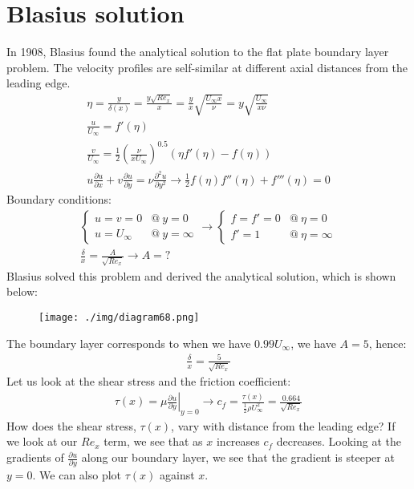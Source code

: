 \section{Blasius solution}
In 1908, Blasius found the analytical solution to the flat plate boundary layer problem. The velocity profiles are self-similar at different axial distances from the leading edge.
\begin{gather}
  \eta = \frac{y}{\delta (x)} = \frac{y\sqrt{Re_x}}{x} = \frac{y}{x} \sqrt{\frac{U_\infty x}{\nu}} = y\sqrt{\frac{U_\infty}{x\nu}}\\
  \frac{u}{U_\infty} = f'(\eta)\\
  \frac{v}{U_\infty} = \frac{1}{2} \left( \frac{\nu}{x U_\infty} \right)^{0.5} \left(\eta f'(\eta) - f (\eta)\right)\\
  u \frac{\partial u}{\partial x} + v\frac{\partial u}{\partial y} = \nu \frac{\partial^2 u}{\partial y^2} \rightarrow \frac{1}{2} f(\eta) f''(\eta)+f'''(\eta) = 0
\end{gather}
Boundary conditions:
\begin{gather}
  \begin{cases}
    u = v = 0    & @\  y = 0     \\
    u = U_\infty & @\ y = \infty
  \end{cases}\rightarrow \begin{cases}
    f = f' = 0 & @ \ \eta = 0      \\
    f' = 1     & @ \ \eta = \infty
  \end{cases}\\
  \frac{\delta}{x} = \frac{A}{\sqrt{Re_x}} \rightarrow A = ?
\end{gather}
Blasius solved this problem and derived the analytical solution, which is shown below:
\begin{figure}[H]
  \centering
  \texttt{[image: ./img/diagram68.png]}
  \caption{}
\end{figure}
The boundary layer corresponds to when we have $0.99 U_\infty$, we have $A = 5$, hence:
\begin{align}
  \frac{\delta}{x} = \frac{5}{\sqrt{Re_x}}
\end{align}
Let us look at the shear stress and the friction coefficient:
\begin{align}
  \tau (x) = \mu \left. \frac{\partial u}{\partial y}\right|_{y=0} \rightarrow c_f = \frac{\tau (x)}{\frac{1}{2}\rho U^2_\infty} = \frac{0.664}{\sqrt{Re_x}}
\end{align}
How does the shear stress, $\tau (x)$, vary with distance from the leading edge? If we look at our $Re_x$ term, we see that as $x$ increases $c_f$ decreases. Looking at the gradients of $\frac{\partial u}{\partial y}$ along our boundary layer, we see that the gradient is steeper at $y = 0$. We can also plot $\tau (x)$ against $x$.
